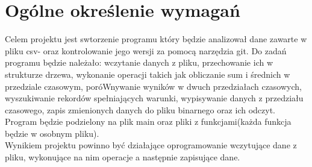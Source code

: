 	\newpage
\section{Ogólne określenie wymagań}		%

\hspace{0.60cm}

Celem projektu jest swtorzenie programu który będzie analizował dane zawarte w pliku csv- oraz kontrolowanie jego wersji za pomocą narzędzia git. Do zadań programu będzie należało: wczytanie danych z pliku, przechowanie ich w strukturze drzewa, wykonanie operacji takich jak obliczanie sum i średnich w przedziale czasowym, poróWnywanie wyników w dwuch przedziałach czasowych, wyszukiwanie rekordów spełniających warunki, wypisywanie danych z przedziału czasowego, zapis zmienionych danych do pliku binarnego oraz ich odczyt.
\\
Program będzie podzielony na plik main oraz pliki z funkcjami(każda funkcja będzie w osobnym pliku).
\\Wynikiem projektu powinno być działające oprogramowanie wczytujące dane z pliku, wykonujące na nim operacje a następnie zapisujące dane.

